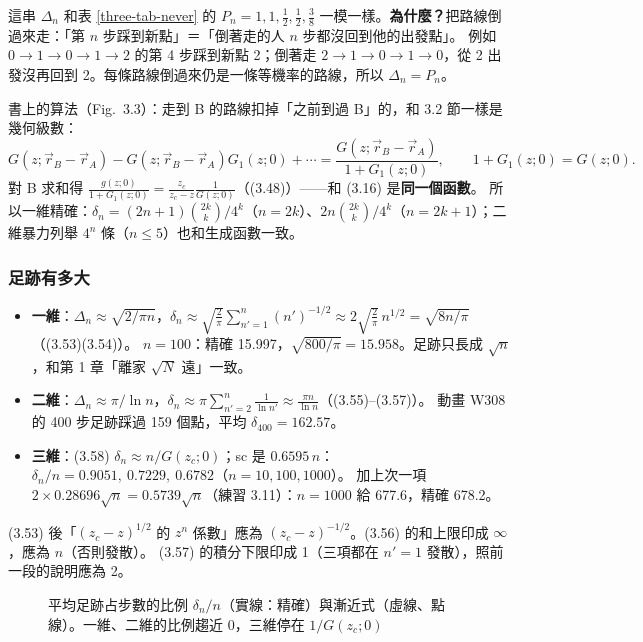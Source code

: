 這串 $\Delta_n$ 和表 \ref{three-tab-never} 的 $P_n=1,1,\frac12,\frac12,\frac38$ 一模一樣。\textbf{為什麼？}把路線倒過來走：「第 $n$ 步踩到新點」＝「倒著走的人 $n$ 步都沒回到他的出發點」。
例如 $0\to1\to0\to1\to2$ 的第 4 步踩到新點 2；倒著走 $2\to1\to0\to1\to0$，從 2 出發沒再回到 2。每條路線倒過來仍是一條等機率的路線，所以 $\Delta_n=P_n$。

書上的算法（Fig.~3.3）：走到 B 的路線扣掉「之前到過 B」的，和 3.2 節一樣是幾何級數：
\[G(z;\vec r_B-\vec r_A)-G(z;\vec r_B-\vec r_A)G_1(z;0)+\cdots=\frac{G(z;\vec r_B-\vec r_A)}{1+G_1(z;0)},\qquad 1+G_1(z;0)=G(z;0).\tag{3.44--3.47}\]
對 B 求和得 $\frac{g(z;0)}{1+G_1(z;0)}=\frac{z_c}{z_c-z}\frac{1}{G(z;0)}$（(3.48)）——和 (3.16) 是\textbf{同一個函數}。
所以一維精確：$\delta_n=(2n+1)\binom{2k}{k}/4^k$（$n=2k$）、$2n\binom{2k}{k}/4^k$（$n=2k+1$）；二維暴力列舉 $4^n$ 條（$n\le5$）也和生成函數一致。

\subsubsection{足跡有多大}
\begin{itemize}
\item \textbf{一維}：$\Delta_n\approx\sqrt{2/\pi n}$，$\delta_n\approx\sqrt{\frac2\pi}\sum_{n'=1}^n(n')^{-1/2}\approx2\sqrt{\frac2\pi}\,n^{1/2}=\sqrt{8n/\pi}$（(3.53)(3.54)）。
      $n=100$：精確 15.997，$\sqrt{800/\pi}=15.958$。足跡只長成 $\sqrt n$，和第 1 章「離家 $\sqrt N$ 遠」一致。
\item \textbf{二維}：$\Delta_n\approx\pi/\ln n$，$\delta_n\approx\pi\sum_{n'=2}^{n}\frac{1}{\ln n'}\approx\frac{\pi n}{\ln n}$（(3.55)--(3.57)）。
      動畫 W308 的 400 步足跡踩過 159 個點，平均 $\delta_{400}=162.57$。
\item \textbf{三維}：(3.58) $\delta_n\approx n/G(z_c;0)$；sc 是 $0.6595\,n$：$\delta_n/n=0.9051,\ 0.7229,\ 0.6782$（$n=10,100,1000$）。
      加上次一項 $2\times0.28696\sqrt n=0.5739\sqrt n$（練習 3.11）：$n=1000$ 給 677.6，精確 678.2。
\end{itemize}
\begin{errbox}[p.~66--67，(3.53)--(3.57)]
(3.53) 後「$(z_c-z)^{1/2}$ 的 $z^n$ 係數」應為 $(z_c-z)^{-1/2}$。(3.56) 的和上限印成 $\infty$，應為 $n$（否則發散）。
(3.57) 的積分下限印成 1（三項都在 $n'=1$ 發散），照前一段的說明應為 2。
\end{errbox}
\begin{figure}[H]
\centering
\ThreeFigFoot
\caption{平均足跡占步數的比例 $\delta_n/n$（實線：精確）與漸近式（虛線、點線）。一維、二維的比例趨近 0，三維停在 $1/G(z_c;0)$}\label{three-fig-foot}
\end{figure}
\begin{table}[H]
\centering
\ThreeTabFoot
\caption{平均足跡 $\delta_n$：精確值與漸近式（二維的 $\pi n/\ln n$ 收斂得很慢）}\label{three-tab-foot}
\end{table}

